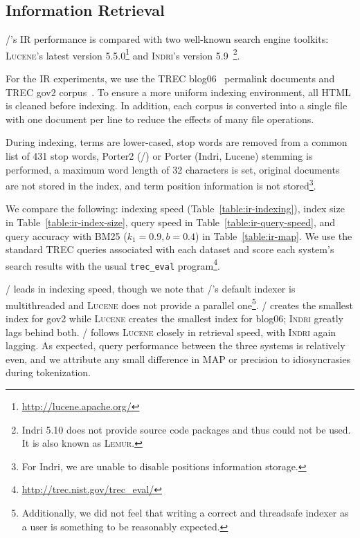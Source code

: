 \subsection{Information Retrieval}

\meta/'s IR performance is compared with two well-known search engine toolkits:
\textsc{Lucene}'s latest version 5.5.0\footnote{\url{http://lucene.apache.org/}} and
\textsc{Indri}'s version 5.9~\citep{lemur}\footnote{Indri 5.10 does not
provide source code packages and thus could not be used. It is also known
as \textsc{Lemur}.}.

For the IR experiments, we use the TREC blog06~\citep{blog06} permalink documents
and TREC gov2 corpus~\citep{gov2}. To ensure a more uniform indexing environment,
all HTML is cleaned before indexing. In addition, each corpus is converted into
a single file with one document per line to reduce the effects of many file
operations.

During indexing, terms are lower-cased, stop words are removed from a common
list of 431 stop words, Porter2 (\meta/) or Porter (Indri, Lucene) stemming is
performed, a maximum word length of 32 characters is set, original documents are
not stored in the index, and term position information is not
stored\footnote{For Indri, we are unable to disable positions information
storage.}.

We compare the following: indexing speed (Table~\ref{table:ir-indexing}), index
size in Table~\ref{table:ir-index-size}, query speed in
Table~\ref{table:ir-query-speed}, and query accuracy with BM25 ($k_1=0.9,
b=0.4$) in Table~\ref{table:ir-map}. We use the standard TREC queries associated
with each dataset and score each system's search results with the usual
\texttt{trec\_eval} program\footnote{\url{http://trec.nist.gov/trec_eval/}}.

\meta/ leads in indexing speed, though we note that \meta/'s default
indexer is multithreaded and \textsc{Lucene} does not provide a parallel
one\footnote{Additionally, we did not feel that writing a correct and threadsafe
indexer as a user is something to be reasonably expected.}. \meta/ creates the
smallest index for gov2 while \textsc{Lucene} creates the smallest index for
blog06; \textsc{Indri} greatly lags behind both. \meta/ follows \textsc{Lucene}
closely in retrieval speed, with \textsc{Indri} again lagging. As expected,
query performance between the three systems is relatively even, and we attribute
any small difference in MAP or precision to idiosyncrasies during tokenization.

